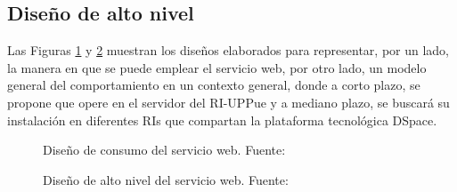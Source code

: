 \subsection{Dise\~{n}o de alto nivel}

Las Figuras \ref{disenoAlto1} y \ref{disenoAlto2} muestran los dise\~{n}os elaborados para representar, por un lado, la manera en que se puede emplear el servicio web,  por otro lado, un modelo general del comportamiento en un contexto general, donde a corto plazo, se propone que opere en el  servidor del RI-UPPue y a mediano plazo, se buscar\'a su instalaci\'on en diferentes RIs que compartan la plataforma tecnol\'ogica DSpace.

\begin{figure}[!ht]
	\centering
    \caption{Dise\~{n}o de consumo del servicio web. Fuente: \cite{SOMIdiseno}} %
    \label{disenoAlto1}
\end{figure}

\begin{figure}[!ht]
	\centering
    \caption{Dise\~{n}o de alto nivel del servicio web. Fuente: \cite{SOMIdiseno}} %
    \label{disenoAlto2}
\end{figure}

